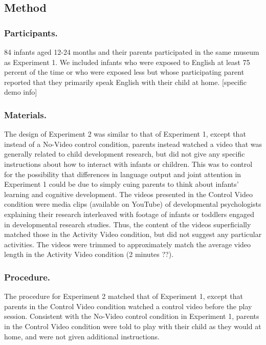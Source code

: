 \documentclass[10pt, letterpaper]{article}
\begin{document}
\subsection{Method}\label{method-1}

\subsubsection{Participants.}\label{participants.-1}

84 infants aged 12-24 months and their parents participated in the same
museum as Experiment 1. We included infants who were exposed to English
at least 75 percent of the time or who were exposed less but whose
participating parent reported that they primarily speak English with
their child at home. {[}specific demo info{]}

\subsubsection{Materials.}\label{materials.-1}

The design of Experiment 2 was similar to that of Experiment 1, except
that instead of a No-Video control condition, parents instead watched a
video that was generally related to child development research, but did
not give any specific instructions about how to interact with infants or
children. This was to control for the possibility that differences in
language output and joint attention in Experiment 1 could be due to
simply cuing parents to think about infants' learning and cognitive
development. The videos presented in the Control Video condition were
media clips (available on YouTube) of developmental psychologists
explaining their research interleaved with footage of infants or
toddlers engaged in developmental research studies. Thus, the content of
the videos superficially matched those in the Activity Video condition,
but did not suggest any particular activities. The videos were trimmed
to approximately match the average video length in the Activity Video
condition (2 minutes ??).

\subsubsection{Procedure.}\label{procedure.-1}

The procedure for Experiment 2 matched that of Experiment 1, except that
parents in the Control Video condition watched a control video before
the play session. Consistent with the No-Video control condition in
Experiment 1, parents in the Control Video condition were told to play
with their child as they would at home, and were not given additional
instructions.
\end{document}
